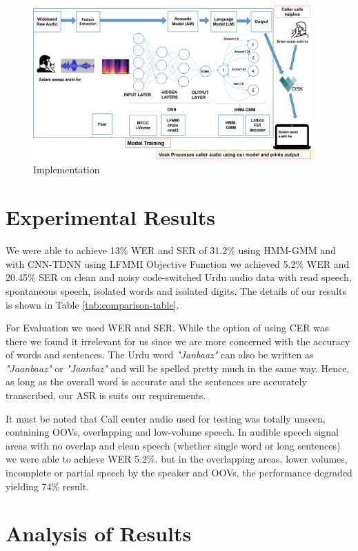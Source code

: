 \documentclass{article}
\begin{document}
\begin{figure}[htbp]
    \includegraphics[width=0.95\textwidth]{img/Implement2.png}
    \caption{Implementation}
    \label{fig:implementation-architecture}
\end{figure}

\section{Experimental Results}
\label{sec:experimental-results}
We were able to achieve 13\% WER and SER of 31.2\% using HMM-GMM and with CNN-TDNN using LFMMI Objective Function we achieved 5.2\% WER and 20.45\% SER on clean and noisy code-switched Urdu audio data with read speech, spontaneous speech, isolated words and isolated digits. The details of our results is shown in Table \ref{tab:comparison-table}. 

For Evaluation we used WER and SER. While the option of using CER was there we found it irrelevant for us since we are more concerned with the accuracy of words and sentences. The Urdu word \textit{"Janbaaz"} can also be written as \textit{"Jaanbaaz"} or \textit{"Jaanbaz"} and will be spelled pretty much in the same way. Hence, as long as the overall word is accurate and the sentences are accurately transcribed, our ASR is suits our requirements.

It must be noted that Call center audio used for testing was totally unseen, containing OOVs, overlapping and low-volume speech. In audible speech signal areas with no overlap and clean speech (whether single word or long sentences) we were able to achieve WER 5.2\%. but in the overlapping areas, lower volumes, incomplete or partial speech by the speaker and OOVs, the performance degraded yielding 74\% result. 

\section{Analysis of Results}
\label{se:discussion}
\end{document}
